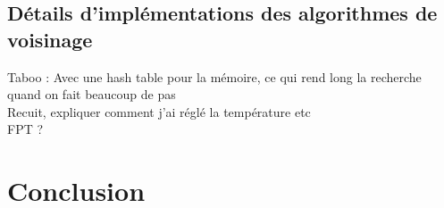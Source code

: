 \documentclass[english]{article}
\begin{document}
\subsection{Détails d'implémentations des algorithmes de voisinage}
Taboo : Avec une hash table pour la mémoire, ce qui rend long la recherche quand on fait beaucoup de pas\\
Recuit, expliquer comment j'ai réglé la température etc\\

FPT ?

\section{Conclusion}


\end{document}

